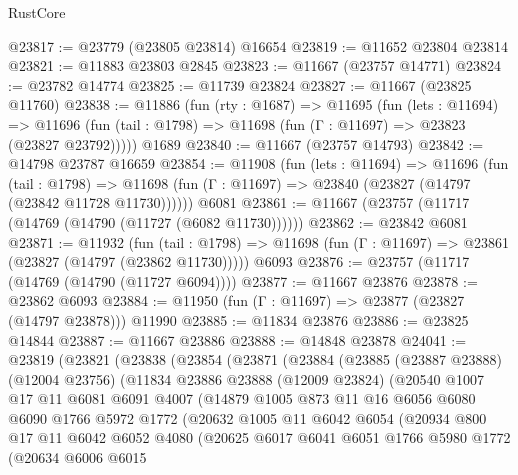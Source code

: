 \begin{lexlean}{RustCore}
\begin{coremodule}
@23817 := @23779 (@23805 @23814) @16654
@23819 := @11652 @23804 @23814
@23821 := @11883 @23803 @2845
@23823 := @11667 (@23757 @14771)
@23824 := @23782 @14774
@23825 := @11739 @23824
@23827 := @11667 (@23825 @11760)
@23838 := @11886
    (fun (rty : @1687) =>
    @11695
      (fun (lets : @11694) =>
      @11696 (fun (tail : @1798) => @11698 (fun (Γ : @11697) => @23823 (@23827 @23792)))))
    @1689
@23840 := @11667 (@23757 @14793)
@23842 := @14798 @23787 @16659
@23854 := @11908
    (fun (lets : @11694) =>
    @11696
      (fun (tail : @1798) =>
      @11698 (fun (Γ : @11697) => @23840 (@23827 (@14797 (@23842 @11728 @11730))))))
    @6081
@23861 := @11667 (@23757 (@11717 (@14769 (@14790 (@11727 (@6082 @11730))))))
@23862 := @23842 @6081
@23871 := @11932
    (fun (tail : @1798) => @11698 (fun (Γ : @11697) => @23861 (@23827 (@14797 (@23862 @11730)))))
    @6093
@23876 := @23757 (@11717 (@14769 (@14790 (@11727 @6094))))
@23877 := @11667 @23876
@23878 := @23862 @6093
@23884 := @11950 (fun (Γ : @11697) => @23877 (@23827 (@14797 @23878))) @11990
@23885 := @11834 @23876
@23886 := @23825 @14844
@23887 := @11667 @23886
@23888 := @14848 @23878
@24041 := @23819
    (@23821
      (@23838
        (@23854
          (@23871
            (@23884
              (@23885
                (@23887 @23888)
                (@12004 @23756)
                (@11834
                  @23886
                  @23888
                  (@12009 @23824)
                  (@20540
                    @1007
                    @17
                    @11
                    @6081
                    @6091
                    @4007
                    (@14879
                      @1005
                      @873
                      @11
                      @16
                      @6056
                      @6080
                      @6090
                      @1766
                      @5972
                      @1772
                      (@20632
                        @1005
                        @11
                        @6042
                        @6054
                        (@20934
                          @800
                          @17
                          @11
                          @6042
                          @6052
                          @4080
                          (@20625
                            @6017
                            @6041
                            @6051
                            @1766
                            @5980
                            @1772
                            (@20634
                              @6006
                              @6015

\end{coremodule}
\end{lexlean}
